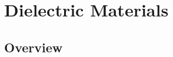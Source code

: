 \renewcommand{\lastmod}{September 18, 2023}
\renewcommand{\chapterauthors}{Markus Lippitz}

\chapter{Dielectric Materials}

\section{Overview}



\printbibliography[segment=\therefsegment,heading=subbibliography]
